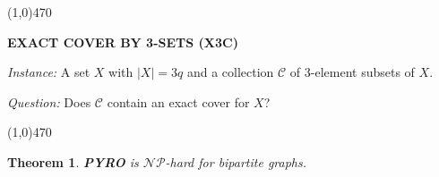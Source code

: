 \documentclass[12pt]{article}
\newtheorem{theorem}{Theorem}
\newcommand{\me}[1]{{\textcolor{blue}{ [\textbf{M.E..:}}\  \textcolor{blue}{{\em #1}]}}}
\begin{document}
\noindent\line(1,0){470}  

{\small{\textbf{EXACT COVER BY 3-SETS (X3C)}}}  

\emph{Instance:} A set $X$ with $|X|=3q$ and a collection $\mathcal{C}$ of $3$-element subsets of $X$.  

\emph{Question:} Does $\mathcal{C}$ contain an exact cover for $X$? \vspace{0.05in}

\noindent\line(1,0){470}\medskip


\begin{theorem}\label{thm:complexity} {\small{\textbf{PYRO}}} is $\mathcal{NP}$-hard for bipartite graphs.
\end{theorem}

\end{document}
